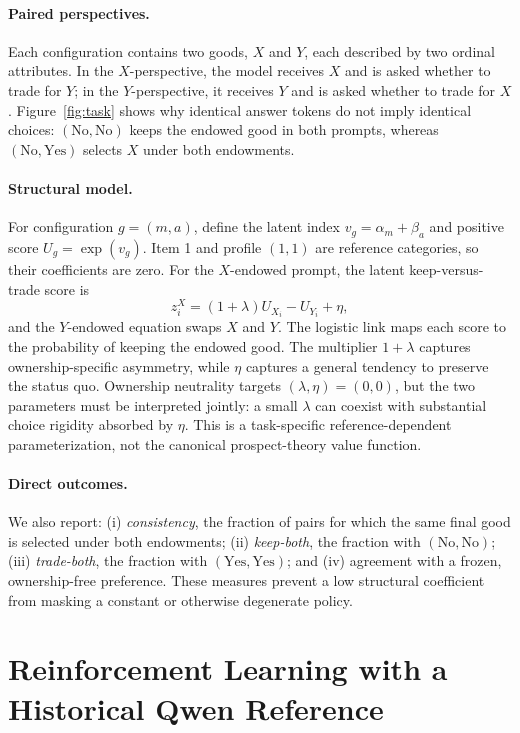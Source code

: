 \documentclass[letterpaper]{article} %
\begin{document}
\paragraph{Paired perspectives.}
Each configuration contains two goods, $X$ and $Y$, each described by two
ordinal attributes. In the $X$-perspective, the model receives $X$ and is asked
whether to trade for $Y$; in the $Y$-perspective, it receives $Y$ and is asked
whether to trade for $X$. Figure~\ref{fig:task} shows why identical answer
tokens do not imply identical choices: $(\text{No},\text{No})$ keeps the
endowed good in both prompts, whereas $(\text{No},\text{Yes})$ selects $X$
under both endowments.

\paragraph{Structural model.}
For configuration $g=(m,a)$, define the latent index
$v_g=\alpha_m+\beta_a$ and positive score $U_g=\exp(v_g)$. Item 1 and profile
$(1,1)$ are reference categories, so their coefficients are zero. For the
$X$-endowed prompt, the latent keep-versus-trade score is
\begin{equation}
z_i^X=(1+\lambda)U_{X_i}-U_{Y_i}+\eta,
\end{equation}
and the $Y$-endowed equation swaps $X$ and $Y$. The logistic link maps each
score to the probability of keeping the endowed good. The multiplier
$1+\lambda$ captures ownership-specific asymmetry, while $\eta$ captures a
general tendency to preserve the status quo. Ownership neutrality targets
$(\lambda,\eta)=(0,0)$, but the two parameters must be interpreted jointly:
a small $\lambda$ can coexist with substantial choice rigidity absorbed by
$\eta$. This is a task-specific reference-dependent parameterization, not the
canonical prospect-theory value function.

\paragraph{Direct outcomes.}
We also report: (i) \emph{consistency}, the fraction of pairs for which the
same final good is selected under both endowments; (ii) \emph{keep-both}, the
fraction with $(\text{No},\text{No})$; (iii) \emph{trade-both}, the fraction
with $(\text{Yes},\text{Yes})$; and (iv) agreement with a frozen,
ownership-free preference. These measures prevent a low structural coefficient
from masking a constant or otherwise degenerate policy.

\section{Reinforcement Learning with a Historical Qwen Reference}
\end{document}
